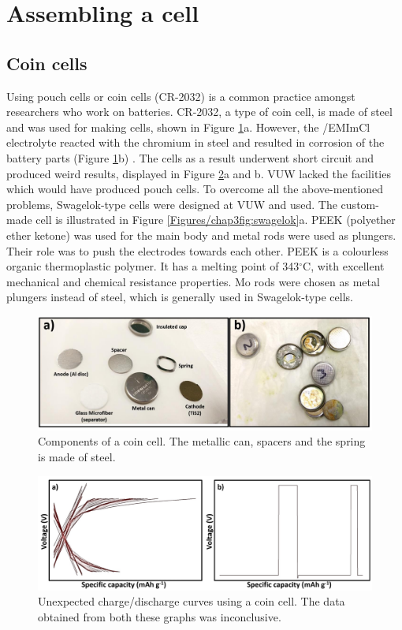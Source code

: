\section{Assembling a cell}

\subsection*{Coin cells}
Using pouch cells or coin cells (CR-2032\textregistered) is a common practice amongst researchers who work on batteries. CR-2032, a type of coin cell, is made of steel and was used for making cells, shown in Figure \ref{Figures/chap3fig:concell}a. However, the /EMImCl electrolyte reacted with the chromium in steel and resulted in corrosion of the battery parts (Figure \ref{Figures/chap3fig:concell}b) \cite{das_aluminium-ion_2017}. The cells as a result underwent short circuit and produced weird results, displayed in Figure \ref{Figures/chap3fig:weirdcdc}a and b. VUW lacked the facilities which would have produced pouch cells. To overcome all the above-mentioned problems, Swagelok-type cells were designed at VUW and used. The custom-made cell is illustrated in Figure \ref{Figures/chap3fig:swagelok}a. PEEK (polyether ether ketone) was used for the main body and metal rods were used as plungers. Their role was to push the electrodes towards each other. PEEK is a colourless organic thermoplastic polymer. It has a melting point of 343$^{\circ}$C, with excellent mechanical and chemical resistance properties. Mo rods were chosen as metal plungers instead of steel, which is generally used in Swagelok-type cells. 

\begin{figure}[tbh!]
\centering
\includegraphics[width=\textwidth]{Figures/chap3fig/concell.pdf}
\caption{Components of a coin cell. The metallic can, spacers and the spring is made of steel.}
\label{Figures/chap3fig:concell}
\end{figure}

\begin{figure}[tbh!]
\centering
\includegraphics[width=\textwidth]{Figures/chap3fig/weirdcdc.pdf}
\caption{Unexpected charge/discharge curves using a coin cell. The data obtained from both these graphs was inconclusive.}
\label{Figures/chap3fig:weirdcdc}
\end{figure}

